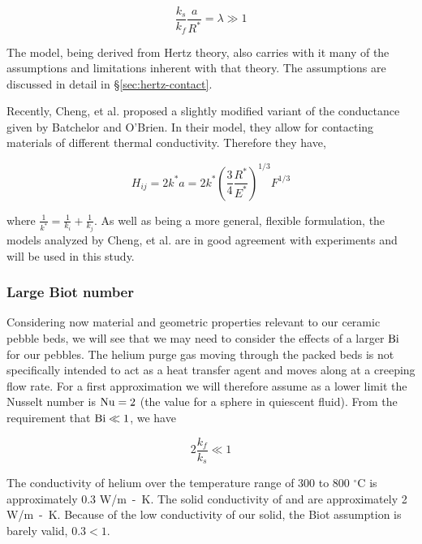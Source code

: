 \begin{equation}
	\frac{ k_s }{ k_f } \frac{a}{R^*} = \lambda \gg 1
\end{equation}

The model, being derived from Hertz theory, also carries with it many of the assumptions and limitations inherent with that theory. The assumptions are discussed in detail in \S\ref{sec:hertz-contact}.

Recently, Cheng, et al.\cite{Cheng19994199} proposed a slightly modified variant of the conductance given by Batchelor and O'Brien. In their model, they allow for contacting materials of different thermal conductivity. Therefore they have,

\begin{equation}
	H_{ij} = 2k^*a = 2k^* \left(\frac{3}{4}\frac{R^*}{E^*}\right)^{1/3}F^{1/3}
\end{equation}

where $\frac{1}{k^*} = \frac{1}{k_i} + \frac{1}{k_j}$. As well as being a more general, flexible formulation, the models analyzed by Cheng, et al.\cite{Cheng19994199} are in good agreement with experiments and will be used in this study.






\subsubsection{Large Biot number}
Considering now material and geometric properties relevant to our ceramic pebble beds, we will see that we may need to consider the effects of a larger $\mathrm{Bi}$ for our pebbles. The helium purge gas moving through the packed beds is not specifically intended to act as a heat transfer agent and moves along at a creeping flow rate. For a first approximation we will therefore assume as a lower limit the Nusselt number is $\mathrm{Nu} = 2$ (the value for a sphere in quiescent fluid). From the requirement that $\mathrm{Bi} \ll 1$, we have

\begin{equation}
	2 \frac{k_f}{k_s} \ll 1
\end{equation}

The conductivity of helium over the temperature range of 300 to 800 $^\circ$C is approximately 0.3 \si{W/m-K}. The solid conductivity of \lit and \lis are approximately 2 \si{W/m-K}. Because of the low conductivity of our solid, the Biot assumption is barely valid, $0.3 < 1$. 
